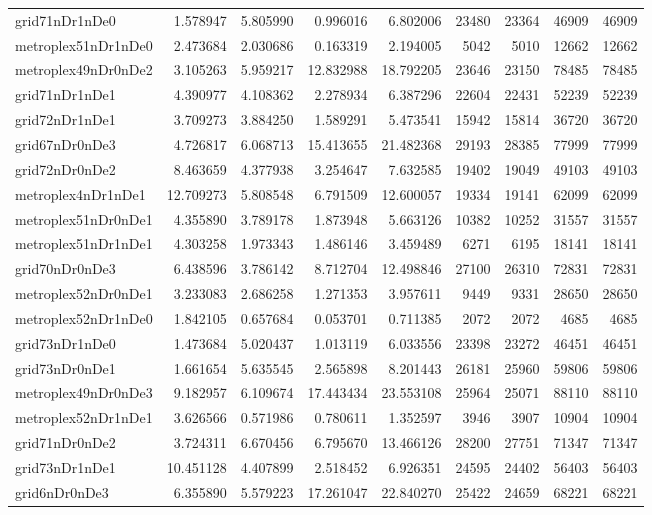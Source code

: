 \begin{longtable}{|l|r|r|r|r|r|r|r|r|}
grid71nDr1nDe0 & 1.578947 & 5.805990 & 0.996016 & 6.802006 & 23480 & 23364 & 46909 & 46909 \\
metroplex51nDr1nDe0 & 2.473684 & 2.030686 & 0.163319 & 2.194005 & 5042 & 5010 & 12662 & 12662 \\
metroplex49nDr0nDe2 & 3.105263 & 5.959217 & 12.832988 & 18.792205 & 23646 & 23150 & 78485 & 78485 \\
grid71nDr1nDe1 & 4.390977 & 4.108362 & 2.278934 & 6.387296 & 22604 & 22431 & 52239 & 52239 \\
grid72nDr1nDe1 & 3.709273 & 3.884250 & 1.589291 & 5.473541 & 15942 & 15814 & 36720 & 36720 \\
grid67nDr0nDe3 & 4.726817 & 6.068713 & 15.413655 & 21.482368 & 29193 & 28385 & 77999 & 77999 \\
grid72nDr0nDe2 & 8.463659 & 4.377938 & 3.254647 & 7.632585 & 19402 & 19049 & 49103 & 49103 \\
metroplex4nDr1nDe1 & 12.709273 & 5.808548 & 6.791509 & 12.600057 & 19334 & 19141 & 62099 & 62099 \\
metroplex51nDr0nDe1 & 4.355890 & 3.789178 & 1.873948 & 5.663126 & 10382 & 10252 & 31557 & 31557 \\
metroplex51nDr1nDe1 & 4.303258 & 1.973343 & 1.486146 & 3.459489 & 6271 & 6195 & 18141 & 18141 \\
grid70nDr0nDe3 & 6.438596 & 3.786142 & 8.712704 & 12.498846 & 27100 & 26310 & 72831 & 72831 \\
metroplex52nDr0nDe1 & 3.233083 & 2.686258 & 1.271353 & 3.957611 & 9449 & 9331 & 28650 & 28650 \\
metroplex52nDr1nDe0 & 1.842105 & 0.657684 & 0.053701 & 0.711385 & 2072 & 2072 & 4685 & 4685 \\
grid73nDr1nDe0 & 1.473684 & 5.020437 & 1.013119 & 6.033556 & 23398 & 23272 & 46451 & 46451 \\
grid73nDr0nDe1 & 1.661654 & 5.635545 & 2.565898 & 8.201443 & 26181 & 25960 & 59806 & 59806 \\
metroplex49nDr0nDe3 & 9.182957 & 6.109674 & 17.443434 & 23.553108 & 25964 & 25071 & 88110 & 88110 \\
metroplex52nDr1nDe1 & 3.626566 & 0.571986 & 0.780611 & 1.352597 & 3946 & 3907 & 10904 & 10904 \\
grid71nDr0nDe2 & 3.724311 & 6.670456 & 6.795670 & 13.466126 & 28200 & 27751 & 71347 & 71347 \\
grid73nDr1nDe1 & 10.451128 & 4.407899 & 2.518452 & 6.926351 & 24595 & 24402 & 56403 & 56403 \\
grid6nDr0nDe3 & 6.355890 & 5.579223 & 17.261047 & 22.840270 & 25422 & 24659 & 68221 & 68221 \\

\end{longtable}
